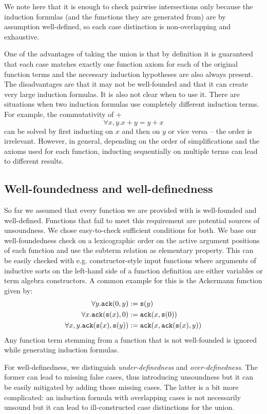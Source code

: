 We note here that it is enough to check pairwise intersections only because the induction formulas (and the functions they are generated from) are by assumption well-defined, so each case distinction is non-overlapping and exhaustive.

One of the advantages of taking the union is that by definition it is guaranteed that each case matches exactly one function axiom for each of the original function terms and the necessary induction hypotheses are also always present. The disadvantages are that it may not be well-founded and that it can create very large induction formulas. It is also not clear when to use it. There are situations when two induction formulas use completely different induction terms. For example, the commutativity of +
$$\forall x,y.x+y=y+x$$
can be solved by first inducting on $x$ and then on $y$ or vice versa -- the order is irrelevant. However, in general, depending on the order of simplifications and the axioms used for each function, inducting sequentially on multiple terms can lead to different results.

\subsection{Well-foundedness and well-definedness}
So far we assumed that every function we are provided with is well-founded and well-defined. Functions that fail to meet this requirement are potential sources of unsoundness. We chose easy-to-check sufficient conditions for both. We base our well-foundedness check on a lexicographic order on the active argument positions of each function and use the subterm relation as elementary property. This can be easily checked with e.g. constructor-style input functions where arguments of inductive sorts on the left-hand side of a function definition are either variables or term algebra constructors. A common example for this is the Ackermann function given by:
$$\begin{aligned}\forall y. \mathtt{ack}(0,y)&:=\mathtt{s}(y)\\
\forall x.\mathtt{ack}(\mathtt{s}(x),0)&:=\mathtt{ack}(x,\mathtt{s}(0))\\
\forall x,y.\mathtt{ack}(\mathtt{s}(x),\mathtt{s}(y))&:=\mathtt{ack}(x,\mathtt{ack}(\mathtt{s}(x),y))\end{aligned}$$
Any function term stemming from a function that is not well-founded is ignored while generating induction formulas.

For well-definedness, we distinguish \textit{under-definedness} and \textit{over-definedness}. The former can lead to missing false cases, thus introducing unsoundness but it can be easily mitigated by adding those missing cases. The latter is a bit more complicated: an induction formula with overlapping cases is not necessarily unsound but it can lead to ill-constructed case distinctions for the union. 

